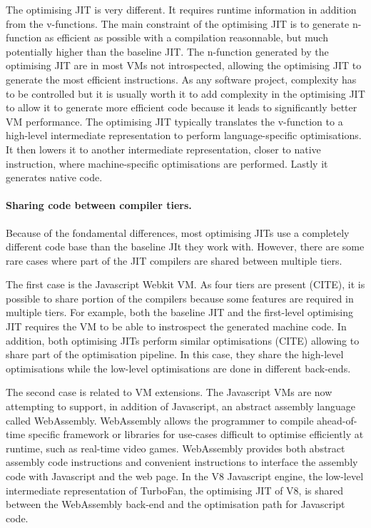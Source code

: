 \documentclass[a4paper,12pt,twoside]{../includes/ThesisStyle}
\begin{document}
The optimising JIT is very different. It requires runtime information in addition from the v-functions. The main constraint of the optimising JIT is to generate n-function as efficient as possible with a compilation reasonnable, but much potentially higher than the baseline JIT. The n-function generated by the optimising JIT are in most VMs not introspected, allowing the optimising JIT to generate the most efficient instructions. As any software project, complexity has to be controlled but it is usually worth it to add complexity in the optimising JIT to allow it to generate more efficient code because it leads to significantly better VM performance. The optimising JIT typically translates the v-function to a high-level intermediate representation to perform language-specific optimisations. It then lowers it to another intermediate representation, closer to native instruction, where machine-specific optimisations are performed. Lastly it generates native code.

\paragraph{Sharing code between compiler tiers.} Because of the fondamental differences, most optimising JITs use a completely different code base than the baseline JIt they work with. However, there are some rare cases where part of the JIT compilers are shared between multiple tiers. 

The first case is the Javascript Webkit VM. As four tiers are present (CITE), it is possible to share portion of the compilers because some features are required in multiple tiers. For example, both the baseline JIT and the first-level optimising JIT requires the VM to be able to instrospect the generated machine code. In addition, both optimising JITs perform similar optimisations (CITE) allowing to share part of the optimisation pipeline. In this case, they share the high-level optimisations while the low-level optimisations are done in different back-ends.

The second case is related to VM extensions. The Javascript VMs are now attempting to support, in addition of Javascript, an abstract assembly language called WebAssembly. WebAssembly allows the programmer to compile ahead-of-time specific framework or libraries for use-cases difficult to optimise efficiently at runtime, such as real-time video games. WebAssembly provides both abstract assembly code instructions and convenient instructions to interface the assembly code with Javascript and the web page. In the V8 Javascript engine, the low-level intermediate representation of TurboFan, the optimising JIT of V8, is shared between the WebAssembly back-end and the optimisation path for Javascript code.
\end{document}
